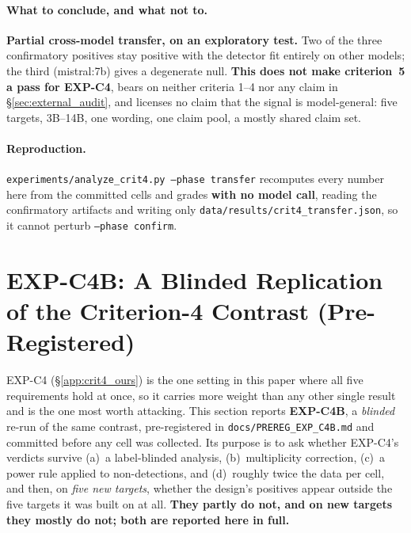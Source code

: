 \paragraph{What to conclude, and what not to.} \textbf{Partial cross-model transfer, on an exploratory test.} Two of the three confirmatory positives stay positive with the detector fit entirely on other models; the third (mistral:7b) gives a degenerate null. \textbf{This does not make criterion~5 a pass for EXP-C4}, bears on neither criteria 1--4 nor any claim in §\ref{sec:external_audit}, and licenses no claim that the signal is model-general: five targets, 3B--14B, one wording, one claim pool, a mostly shared claim set.

\paragraph{Reproduction.} \texttt{experiments/analyze\_crit4.py --phase transfer} recomputes every number here from the committed cells and grades \textbf{with no model call}, reading the confirmatory artifacts and writing only \texttt{data/results/crit4\_transfer.json}, so it cannot perturb \texttt{--phase confirm}.

\section{EXP-C4B: A Blinded Replication of the Criterion-4 Contrast (Pre-Registered)}
\label{app:crit4b}

EXP-C4 (§\ref{app:crit4_ours}) is the one setting in this paper where all five requirements hold at once, so it carries more weight than any other single result and is the one most worth attacking. This section reports \textbf{EXP-C4B}, a \emph{blinded} re-run of the same contrast, pre-registered in \texttt{docs/PREREG\_EXP\_C4B.md} and committed before any cell was collected. Its purpose is to ask whether EXP-C4's verdicts survive (a)~a label-blinded analysis, (b)~multiplicity correction, (c)~a power rule applied to non-detections, and (d)~roughly twice the data per cell, and then, on \emph{five new targets}, whether the design's positives appear outside the five targets it was built on at all. \textbf{They partly do not, and on new targets they mostly do not; both are reported here in full.}

